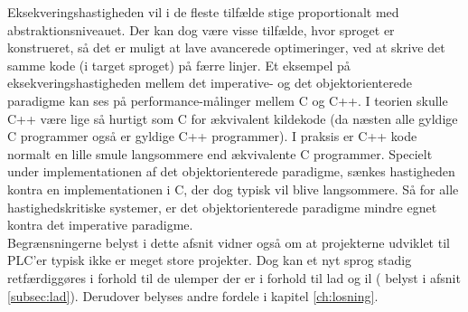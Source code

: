 \noindent Eksekveringshastigheden vil i de fleste tilfælde stige proportionalt med abstraktionsniveauet. Der kan dog være visse tilfælde, hvor sproget er konstrueret, så det er muligt at lave avancerede optimeringer, ved at skrive det samme kode (i target sproget) på færre linjer.
Et eksempel på eksekveringshastigheden mellem det imperative- og det objektorienterede paradigme kan ses på performance-målinger mellem C og C++. I teorien skulle C++ være lige så hurtigt som C for ækvivalent kildekode (da næsten alle gyldige C programmer også er gyldige C++ programmer). I praksis er C++ kode normalt en lille smule langsommere end ækvivalente C programmer. Specielt under implementationen af det objektorienterede paradigme, sænkes hastigheden kontra en implementationen i C, der dog typisk vil blive langsommere. Så for alle hastighedskritiske systemer, er det objektorienterede paradigme mindre egnet kontra det imperative paradigme. \cite{codeprojectCPP} \cite{stackoverflowWhyCPP} \cite{linusWhyC} \cite{cVsCPPJOE}\\

\noindent Begrænsningerne belyst i dette afsnit vidner også om at projekterne udviklet til PLC'er typisk ikke er meget store projekter. Dog kan et nyt sprog stadig retfærdiggøres i forhold til de ulemper der er i forhold til \gls{lad} og \gls{il} ( belyst i afsnit \ref{subsec:lad}). Derudover belyses andre fordele i kapitel \ref{ch:losning}.












